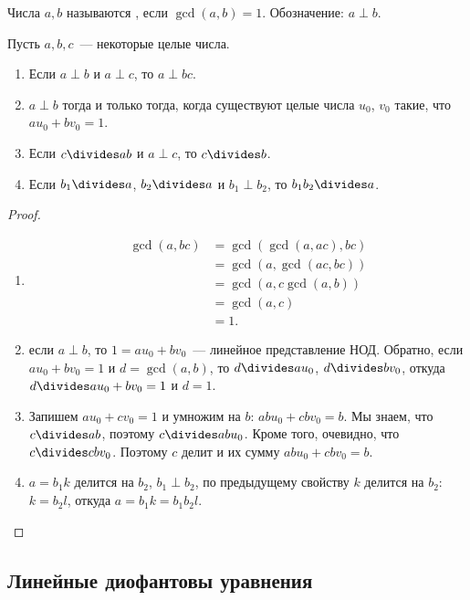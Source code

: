 \begin{definition}
Числа $a,b$ называются , если
$\gcd(a,b)=1$. Обозначение: $a\perp b$.
\end{definition}

\begin{proposition}\label{prop_properties_of_coprime}
Пусть $a,b,c$~--- некоторые целые числа.
\begin{enumerate}
\item Если $a\perp b$ и $a\perp c$, то $a\perp bc$.\label{coprime_prop1}
\item $a\perp b$ тогда и только тогда, когда существуют целые числа
  $u_0$, $v_0$ такие, что $au_0+bv_0=1$.\label{coprime_prop2}
\item Если $c\divides ab$ и $a\perp c$, то $c\divides b$.\label{coprime_prop3}
\item Если $b_1\divides a$, $b_2\divides a$ и $b_1\perp b_2$, то
  $b_1b_2\divides a$.\label{coprime_prop4}
\end{enumerate}
\end{proposition}
\begin{proof}
\begin{enumerate}
\item 
\begin{align*}
\gcd(a,bc)&=\gcd(\gcd(a,ac),bc)\\
&=\gcd(a,\gcd(ac,bc))\\
&=\gcd(a,c\gcd(a,b))\\
&=\gcd(a,c)\\
&=1.
\end{align*}
\item если $a\perp b$, то $1=au_0+bv_0$~--- линейное представление
  НОД. Обратно, если $au_0+bv_0=1$ и $d=\gcd(a,b)$, то $d\divides au_0$,
  $d\divides bv_0$, откуда $d\divides au_0+bv_0 = 1$ и $d=1$.
\item Запишем $au_0+cv_0=1$ и умножим на $b$:
  $abu_0+cbv_0=b$. Мы знаем, что $c\divides ab$, поэтому $c\divides
  abu_0$. Кроме того, очевидно, что $c\divides cbv_0$. Поэтому $c$
  делит и их сумму $abu_0+cbv_0 = b$.
\item $a=b_1k$ делится на $b_2$, $b_1\perp b_2$, по предыдущему
  свойству $k$ делится
  на $b_2$: $k=b_2l$, откуда $a=b_1k=b_1b_2l$.
\end{enumerate}
\end{proof}

\subsection{Линейные диофантовы уравнения}

